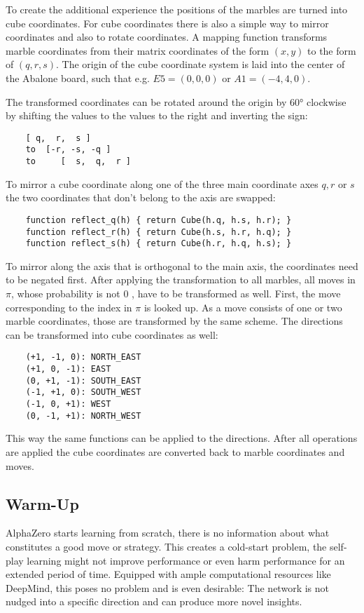 To create the additional experience the positions of the marbles are turned into cube coordinates. For cube coordinates there is also a simple way to mirror coordinates and also to rotate coordinates. A mapping function transforms marble coordinates from their matrix coordinates of the form $(x, y)$ to the form of $(q, r, s)$. The origin of the cube coordinate system is laid into the center of the Abalone board, such that e.g. $E5 = (0, 0, 0)$ or $A1 = (-4, 4, 0)$.

The transformed coordinates can be rotated around the origin by 60° clockwise by shifting the values to the values to the right and inverting the sign:

\begin{BVerbatim}
    [ q,  r,  s ]
    to  [-r, -s, -q ]
    to     [  s,  q,  r ]
\end{BVerbatim}

To mirror a cube coordinate along one of the three main coordinate axes $q, r$ or $s$ the two coordinates that don't belong to the axis are swapped:

\begin{BVerbatim}
    function reflect_q(h) { return Cube(h.q, h.s, h.r); }
    function reflect_r(h) { return Cube(h.s, h.r, h.q); }
    function reflect_s(h) { return Cube(h.r, h.q, h.s); }
\end{BVerbatim}

To mirror along the axis that is orthogonal to the main axis, the coordinates need to be negated first. After applying the transformation to all marbles, all moves in $\pi$, whose probability is not $0$ , have to be transformed as well. First, the move corresponding to the index in $\pi$ is looked up. As a move consists of one or two marble coordinates, those are transformed by the same scheme. The directions can be transformed into cube coordinates as well:

\begin{BVerbatim}
    (+1, -1, 0): NORTH_EAST
    (+1, 0, -1): EAST
    (0, +1, -1): SOUTH_EAST
    (-1, +1, 0): SOUTH_WEST
    (-1, 0, +1): WEST
    (0, -1, +1): NORTH_WEST
\end{BVerbatim}

This way the same functions can be applied to the directions. After all operations are applied the cube coordinates are converted back to marble coordinates and moves.

\subsection{Warm-Up}
AlphaZero starts learning from scratch, there is no information about what constitutes a good move or strategy. This creates a cold-start problem, the self-play learning might not improve performance or even harm performance for an extended period of time. Equipped with ample computational resources like DeepMind, this poses no problem and is even desirable: The network is not nudged into a specific direction and can produce more novel insights.

